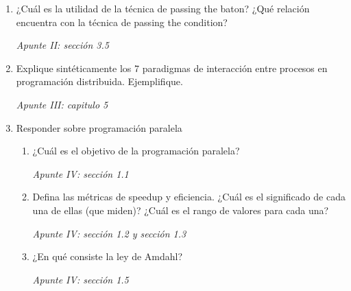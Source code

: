 \documentclass[a4paper, 10pt]{article}
\newenvironment{QandA}{
    \begin{enumerate}\bfseries}
    {\end{enumerate}
}
\newenvironment{answered}{\par\normalfont}{}
\begin{document}
\begin{QandA}

\item ¿Cuál es la utilidad de la técnica de passing the baton? ¿Qué relación encuentra con la técnica de passing the condition?
\begin{answered}
    \emph{Apunte II: sección 3.5}
\end{answered}


\item Explique sintéticamente los 7 paradigmas de interacción entre procesos en programación distribuida. Ejemplifique.
\begin{answered}
    \emph{Apunte III: capitulo 5}
\end{answered}


\item Responder sobre programación paralela
\begin{enumerate}
    \item ¿Cuál es el objetivo de la programación paralela?
    \begin{answered}
        \emph{Apunte IV: sección 1.1}
    \end{answered}
    \item Defina las métricas de speedup y eficiencia. ¿Cuál es el significado de cada una de ellas (que miden)? ¿Cuál es el rango de valores para cada una?
    \begin{answered}
        \emph{Apunte IV: sección 1.2 y sección 1.3}
    \end{answered}
    \item ¿En qué consiste la ley de Amdahl?
    \begin{answered}
        \emph{Apunte IV: sección 1.5}
    \end{answered}
\end{enumerate}



\end{QandA}
\end{document}
